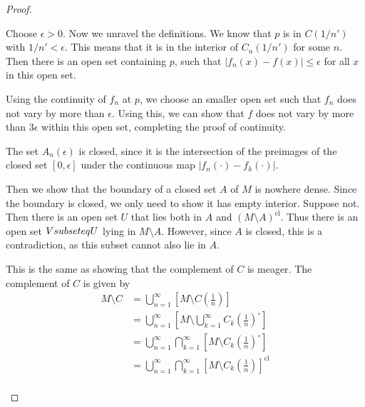 \begin{proof}
	\begin{parts}
	\item Choose $\epsilon>0$. Now we unravel the definitions. We know that $p$ is in $C(1 / n')$ with $1 / n'<\epsilon$. This means that it is in the interior of $C_n(1 / n')$ for some $n$. Then there is an open set containing $p$, such that $|f_n(x)-f(x)|\le \epsilon$ for all $x$ in this open set.

		Using the continuity of $f_n$ at $p$, we choose an smaller open set such that $f_n$ does not vary by more than $\epsilon$. Using this, we can show that $f$ does not vary by more than $3\epsilon$ within this open set, completing the proof of continuity.
	\item The set $A_n(\epsilon)$ is closed, since it is the intersection of the preimages of the closed set $[0,\epsilon]$ under the continuous map $|f_n(\cdot)-f_k(\cdot)|$. 

		Then we show that the boundary of a closed set $A$ of $M$ is nowhere dense. Since the boundary is closed, we only need to show it has empty interior. Suppose not. Then there is an open set $U$ that lies both in $A$ and $(M\setminus A)^\text{cl}$. Thus there is an open set $V\\subseteq U$ lying in $M \setminus A$. However, since $A$ is closed, this is a contradiction, as this subset cannot also lie in $A$. 
	\item This is the same as showing that the complement of $C$ is meager. The complement of $C$ is given by
		\begin{align*}
			M \setminus C &= \bigcup_{n=1}^\infty \left[ M \setminus C\left( \frac{1}{n} \right)  \right]\\ 
				      &= \bigcup_{n=1}^\infty \left[ M \setminus \bigcup_{k=1}^\infty C_k\left( \frac{1}{n} \right) ^{\circ} \right]\\ 
				      &=\bigcup_{n=1}^\infty \bigcap_{k=1}^\infty \left[M \setminus C_k\left( \frac{1}{n} \right) ^{\circ}\right]\\
				      &=\bigcup_{n=1}^\infty \bigcap_{k=1}^\infty \left[M \setminus C_k\left( \frac{1}{n} \right) \right]^\text{cl}\\
		\end{align*}
	\end{parts}
\end{proof}
